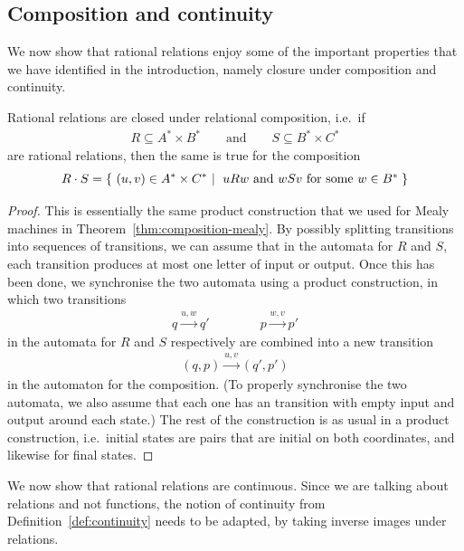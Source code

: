 \subsection{Composition and continuity} We now show that rational relations enjoy some  of the important properties that we have identified in the introduction, namely closure under composition and continuity.



\begin{theorem}\label{thm:composition-rational-relations}
    Rational relations are closed under relational composition, i.e.~if 
    \begin{align*}
    R \subseteq A^* \times B^* 
    \qquad 
    \text{and}
    \qquad 
    S \subseteq B^* \times C^*
    \end{align*}
    are rational relations, then the same is true for the composition
    \begin{align*}
    R \cdot S = \setbuild{ (u,v) \in A^* \times C^*}{ $u R w$ and $w S v$ for some  $w \in B^*$}
    \end{align*}
\end{theorem}
\begin{proof}
    This is essentially the same product  construction that we used for Mealy machines in Theorem~\ref{thm:composition-mealy}. By possibly splitting transitions into sequences of transitions, we can assume that in the automata for $R$ and $S$, each transition produces at most one letter of input or output. Once this has been done, we synchronise the  two automata using  a product construction, in which two transitions
    \begin{align*}
q \xrightarrow{u,w} q' \qquad  \qquad 
    p \xrightarrow{w,v} p'
    \end{align*}
    in the automata  for $R$ and $S$ respectively
    are combined into a new transition 
    \begin{align*}
    (q,p) \xrightarrow{u,v} (q',p')\end{align*} in the automaton for the composition. (To properly synchronise the two automata, we also assume that each one has an transition with empty input and output around each state.)
    The rest of the construction is as usual in a product construction, i.e.~initial states are pairs that are initial on both coordinates, and likewise for final states.
\end{proof}

We now show that rational relations are continuous. Since we are talking about relations and not functions, the notion of continuity from Definition~\ref{def:continuity} needs to be adapted, by taking inverse images under relations.

